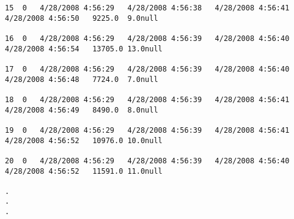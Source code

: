 \begin{scriptsize}
\begin{verbatim}
15	0	4/28/2008 4:56:29	4/28/2008 4:56:38	4/28/2008 4:56:41	4/28/2008 4:56:50	9225.0	9.0null

16	0	4/28/2008 4:56:29	4/28/2008 4:56:39	4/28/2008 4:56:40	4/28/2008 4:56:54	13705.0	13.0null

17	0	4/28/2008 4:56:29	4/28/2008 4:56:39	4/28/2008 4:56:40	4/28/2008 4:56:48	7724.0	7.0null

18	0	4/28/2008 4:56:29	4/28/2008 4:56:39	4/28/2008 4:56:41	4/28/2008 4:56:49	8490.0	8.0null

19	0	4/28/2008 4:56:29	4/28/2008 4:56:39	4/28/2008 4:56:41	4/28/2008 4:56:52	10976.0	10.0null

20	0	4/28/2008 4:56:29	4/28/2008 4:56:39	4/28/2008 4:56:40	4/28/2008 4:56:52	11591.0	11.0null

.
.
.

\end{verbatim}
\end{scriptsize}